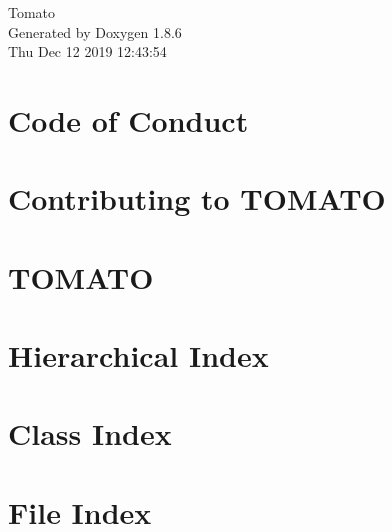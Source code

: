 \documentclass[twoside]{book}
\newcommand{\clearemptydoublepage}{%
  \newpage{\pagestyle{empty}\cleardoublepage}%
}
\begin{document}
\hypersetup{pageanchor=false}
\begin{titlepage}
\vspace*{7cm}
\begin{center}%
{\Large Tomato }\\
\vspace*{1cm}
{\large Generated by Doxygen 1.8.6}\\
\vspace*{0.5cm}
{\small Thu Dec 12 2019 12:43:54}\\
\end{center}
\end{titlepage}
\clearemptydoublepage
\tableofcontents
\clearemptydoublepage
{}
\hypersetup{pageanchor=true}

\chapter{Code of Conduct}
\label{md_codeofconduct}
\hypertarget{md_codeofconduct}{}

\chapter{Contributing to T\-O\-M\-A\-T\-O}
\label{md_contributing}
\hypertarget{md_contributing}{}

\chapter{T\-O\-M\-A\-T\-O}
\label{md__r_e_a_d_m_e}
\hypertarget{md__r_e_a_d_m_e}{}

\chapter{Hierarchical Index}

\chapter{Class Index}

\chapter{File Index}

\end{document}
